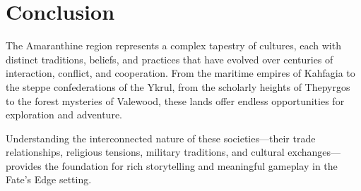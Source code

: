 \section{Conclusion}

The Amaranthine region represents a complex tapestry of cultures, each with distinct traditions, beliefs, and practices that have evolved over centuries of interaction, conflict, and cooperation. From the maritime empires of Kahfagia to the steppe confederations of the Ykrul, from the scholarly heights of Thepyrgos to the forest mysteries of Valewood, these lands offer endless opportunities for exploration and adventure.

Understanding the interconnected nature of these societies—their trade relationships, religious tensions, military traditions, and cultural exchanges—provides the foundation for rich storytelling and meaningful gameplay in the Fate's Edge setting.
